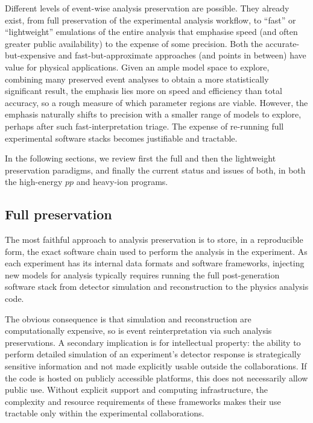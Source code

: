 \documentclass[11pt]{article}
\begin{document}
Different levels of event-wise analysis preservation are possible.
They already exist, from full preservation of the experimental analysis workflow, to ``fast'' or ``lightweight'' emulations of the entire analysis that emphasise speed (and often greater public availability) to the expense of some precision.
Both the accurate-but-expensive and fast-but-approximate approaches (and points in between) have value for physical applications. Given an ample model space to explore, combining many preserved event analyses to obtain a more statistically significant result, the emphasis lies more on speed and efficiency than total accuracy, so a rough measure of which parameter regions are viable.
However, the emphasis naturally shifts to precision with a smaller range of models to explore, perhaps after such fast-interpretation triage.
The expense of re-running full experimental software stacks becomes justifiable and tractable.

In the following sections, we review first the full and then the lightweight preservation paradigms, and finally the current status and issues of both, in both the high-energy $pp$ and heavy-ion programs.


\subsection{Full preservation}\label{section:full-detail-preservation}

The most faithful approach to analysis preservation is to store, in a reproducible form, the exact software chain used to perform the analysis in the experiment. As each experiment has its internal data formats and software frameworks, injecting new models for analysis typically requires running the full post-generation software stack from detector simulation and reconstruction to the physics analysis code.

The obvious consequence is that simulation and reconstruction are computationally expensive, so is event reinterpretation via such \glspl{analysis preservation}. A secondary implication is for intellectual property: the ability to perform detailed simulation of an experiment's detector response is strategically sensitive information and not made explicitly usable outside the collaborations. If the code is hosted on publicly accessible platforms, this does not necessarily allow public use. Without explicit support and computing infrastructure, the complexity and resource requirements of these frameworks makes their use tractable only within the experimental collaborations.
\end{document}
